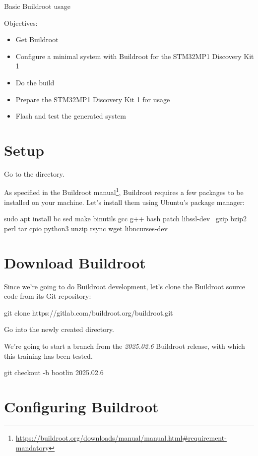 \subchapter
{Basic Buildroot usage}
{Objectives:
  \begin{itemize}
  \item Get Buildroot
  \item Configure a minimal system with Buildroot for the STM32MP1 Discovery Kit 1
  \item Do the build
  \item Prepare the STM32MP1 Discovery Kit 1 for usage
  \item Flash and test the generated system
  \end{itemize}
}

\section{Setup}

Go to the  directory.

As specified in the Buildroot
manual\footnote{\url{https://buildroot.org/downloads/manual/manual.html\#requirement-mandatory}},
Buildroot requires a few packages to be installed on your
machine. Let's install them using Ubuntu's package manager:

\begin{bashinput}
sudo apt install bc sed make binutils gcc g++ bash patch libssl-dev \
  gzip bzip2 perl tar cpio python3 unzip rsync wget libncurses-dev
\end{bashinput}

\section{Download Buildroot}

Since we're going to do Buildroot development, let's clone the
Buildroot source code from its Git repository:

\begin{bashinput}
git clone https://gitlab.com/buildroot.org/buildroot.git
\end{bashinput}

Go into the newly created  directory.

We're going to start a branch from the {\em 2025.02.6} Buildroot
release, with which this training has been tested.

\begin{bashinput}
git checkout -b bootlin 2025.02.6
\end{bashinput}

\section{Configuring Buildroot}

